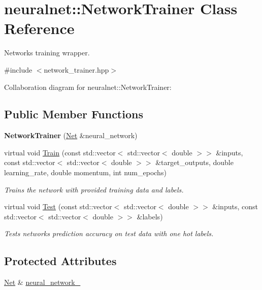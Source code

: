 \hypertarget{classneuralnet_1_1NetworkTrainer}{}\section{neuralnet\+:\+:Network\+Trainer Class Reference}
\label{classneuralnet_1_1NetworkTrainer}


Network\textquotesingle{}s training wrapper.  




{\ttfamily \#include $<$network\+\_\+trainer.\+hpp$>$}



Collaboration diagram for neuralnet\+:\+:Network\+Trainer\+:
\subsection*{Public Member Functions}
\begin{DoxyCompactItemize}
\item 
\mbox{\label{classneuralnet_1_1NetworkTrainer_a4feb5bee93881dd4cd2f72cf9b957bf9}} 
{\bfseries Network\+Trainer} (\hyperlink{classneuralnet_1_1Net}{Net} \&neural\+\_\+network)
\item 
virtual void \hyperlink{classneuralnet_1_1NetworkTrainer_a40f48d1edbe380ba8ef8e7782dbe7903}{Train} (const std\+::vector$<$ std\+::vector$<$ double $>$$>$ \&inputs, const std\+::vector$<$ std\+::vector$<$ double $>$$>$ \&target\+\_\+outputs, double learning\+\_\+rate, double momentum, int num\+\_\+epochs)
\begin{DoxyCompactList}\small\item\em Trains the network with provided training data and labels. \end{DoxyCompactList}\item 
virtual void \hyperlink{classneuralnet_1_1NetworkTrainer_a41b19c85c1b35c36a8a1ee607857bf25}{Test} (const std\+::vector$<$ std\+::vector$<$ double $>$$>$ \&inputs, const std\+::vector$<$ std\+::vector$<$ double $>$$>$ \&labels)
\begin{DoxyCompactList}\small\item\em Tests network\textquotesingle{}s prediction accuracy on test data with \textquotesingle{}one hot\textquotesingle{} labels. \end{DoxyCompactList}\end{DoxyCompactItemize}
\subsection*{Protected Attributes}
\begin{DoxyCompactItemize}
\item 
\hyperlink{classneuralnet_1_1Net}{Net} \& \hyperlink{classneuralnet_1_1NetworkTrainer_a779928ec8b2d74240d6b705f46ecf08a}{neural\+\_\+network\+\_\+}
\end{DoxyCompactItemize}


